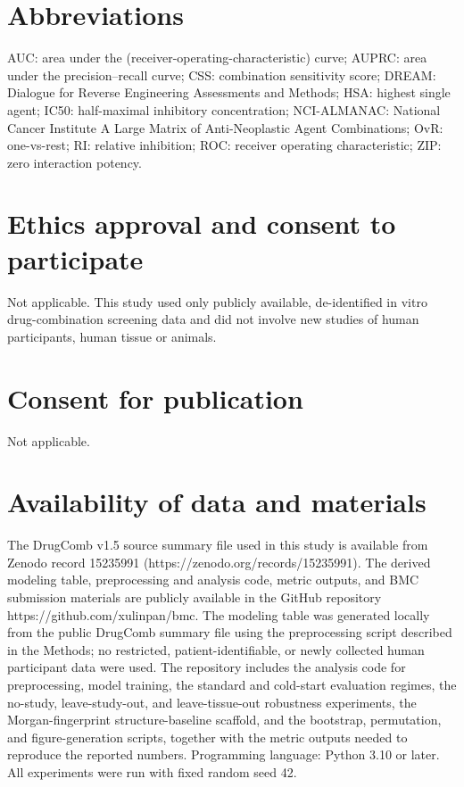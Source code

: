 \documentclass{bmcart}
\begin{document}
\begin{backmatter}

\section*{Abbreviations}
AUC: area under the (receiver-operating-characteristic) curve; AUPRC: area under the precision--recall
curve; CSS: combination sensitivity score; DREAM: Dialogue for Reverse Engineering Assessments and
Methods; HSA: highest single agent; IC50: half-maximal inhibitory concentration; NCI-ALMANAC: National
Cancer Institute A Large Matrix of Anti-Neoplastic Agent Combinations; OvR: one-vs-rest; RI: relative
inhibition; ROC: receiver operating characteristic; ZIP: zero interaction potency.

\section*{Ethics approval and consent to participate}
Not applicable. This study used only publicly available, de-identified in vitro drug-combination
screening data and did not involve new studies of human participants, human tissue or animals.

\section*{Consent for publication}
Not applicable.

\section*{Availability of data and materials}
The DrugComb v1.5 source summary file used in this study is available from Zenodo record 15235991 (https://zenodo.org/records/15235991). The derived modeling table, preprocessing and analysis code, metric outputs, and BMC submission materials are publicly available in the GitHub repository https://github.com/xulinpan/bmc. The modeling table was generated locally from the public DrugComb summary file using the preprocessing script described in the Methods; no restricted, patient-identifiable, or newly collected human participant data were used. The repository includes the analysis code for preprocessing, model training, the standard and cold-start evaluation regimes, the no-study, leave-study-out, and leave-tissue-out robustness experiments, the Morgan-fingerprint structure-baseline scaffold, and the bootstrap, permutation, and figure-generation scripts, together with the metric outputs needed to reproduce the reported numbers. Programming language: Python 3.10 or later. All experiments were run with fixed random seed 42.


\end{backmatter}
\end{document}
